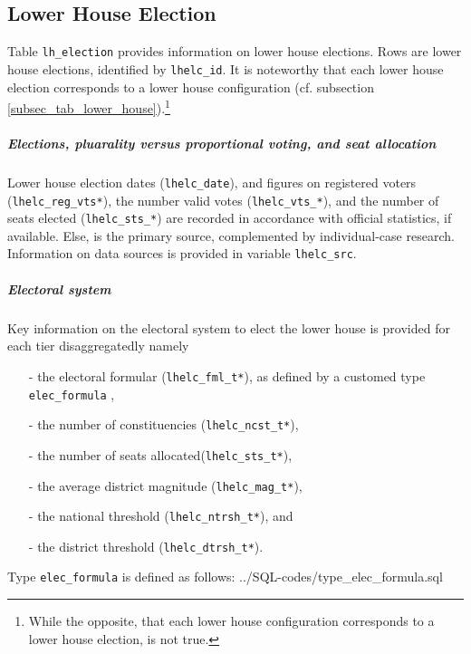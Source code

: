 \subsection{Lower House Election}\label{subsec_tab_lh_election}
Table \texttt{\footnotesize lh\_election} provides information on lower house elections. 
Rows are lower house elections, identified by \texttt{\footnotesize lhelc\_id}. It is noteworthy that each lower house election corresponds to a lower house configuration (cf. subsection \ref{subsec_tab_lower_house}).\footnote{While the opposite, that each lower house configuration corresponds to a lower house election, is not true.}

\subparagraph{Elections, pluarality versus proportional voting, and seat allocation}
Lower house election dates (\texttt{\footnotesize lhelc\_date}), and figures on registered voters (\texttt{\footnotesize lhelc\_reg\_vts*}), the number valid votes (\texttt{\footnotesize lhelc\_vts\_*}), and the number of seats elected (\texttt{\footnotesize lhelc\_sts\_*}) are recorded in accordance with official statistics, if available. 
Else, \citet{Nohlen2001, Nohlen2005, Nohlen2010} is the primary source, complemented by individual-case research. Information on data sources is provided in variable \texttt{\footnotesize lhelc\_src}.

\subparagraph{Electoral system}
Key information on the electoral system to elect the lower house is provided for each tier disaggregatedly namely
\begin{itemize}\itemsep-4pt 
\item[-]{the electoral formular (\texttt{\footnotesize lhelc\_fml\_t*}), as defined by a customed type \texttt{\footnotesize elec\_formula}
,}
\item[-]{the number of constituencies (\texttt{\footnotesize lhelc\_ncst\_t*}),}
\item[-]{the number of seats allocated(\texttt{\footnotesize lhelc\_sts\_t*}),}
\item[-]{the average district magnitude (\texttt{\footnotesize lhelc\_mag\_t*}),}
\item[-]{the national threshold (\texttt{\footnotesize lhelc\_ntrsh\_t*}), and}
\item[-]{the district threshold (\texttt{\footnotesize lhelc\_dtrsh\_t*}).}
\end{itemize}
Type \texttt{\footnotesize elec\_formula} is defined as follows:
%
{../SQL-codes/type_elec_formula.sql}

